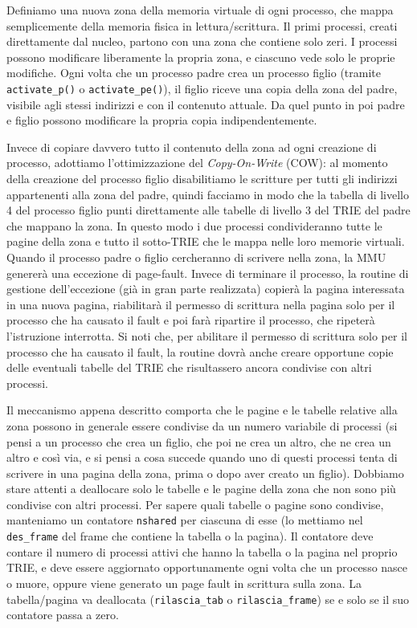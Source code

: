 Definiamo una nuova zona della memoria virtuale di ogni processo, che mappa semplicemente
della memoria fisica in lettura/scrittura. 
Il primi processi, creati direttamente
dal nucleo, partono con una zona che contiene solo zeri.
I processi possono modificare liberamente la propria zona, e ciascuno vede solo le proprie
modifiche.
Ogni volta che un processo padre crea un processo figlio (tramite \verb|activate_p()| o \verb|activate_pe()|), il figlio
riceve una copia della zona del padre, visibile agli stessi indirizzi e con il contenuto attuale.
Da quel punto in poi padre e figlio possono modificare la propria copia indipendentemente.

Invece di copiare davvero tutto il contenuto della zona ad ogni creazione di processo,
adottiamo l'ottimizzazione del {\em Copy-On-Write} (COW): al momento della creazione
del processo figlio disabilitiamo le scritture
per tutti gli indirizzi appartenenti alla zona del padre, quindi facciamo in modo che la tabella
di livello 4 del processo figlio punti direttamente alle tabelle di livello 3 del TRIE del
padre che mappano la zona. In questo modo i due processi condivideranno tutte le pagine della zona
e tutto il sotto-TRIE che le mappa nelle loro memorie virtuali. Quando il processo padre o figlio
cercheranno di scrivere nella zona, la MMU generer\`a una eccezione di page-fault. Invece di
terminare il processo, la routine di gestione dell'eccezione (gi\`a in gran parte realizzata) copier\`a la pagina
interessata in una nuova pagina, riabilitar\`a il permesso di scrittura nella pagina solo per
il processo che ha causato il fault e poi far\`a ripartire il processo, che ripeter\`a l'istruzione
interrotta. Si noti che, per abilitare il permesso di scrittura solo per il processo che ha causato
il fault, la routine dovr\`a anche creare opportune copie delle eventuali tabelle del TRIE che risultassero
ancora condivise con altri processi. 

Il meccanismo appena descritto comporta che le pagine e le tabelle relative
alla zona possono in generale essere condivise da un numero variabile di processi
(si pensi a un processo che crea un figlio, che poi ne crea un altro, che ne crea un altro e cos\`i via, e
si pensi a cosa succede quando uno di questi processi tenta di scrivere in una pagina della zona, prima o dopo
aver creato un figlio).
Dobbiamo stare attenti a deallocare solo le tabelle e le pagine
della zona che non sono pi\`u condivise con altri processi. Per sapere quali tabelle o pagine sono
condivise, manteniamo un contatore \verb|nshared| per ciascuna di esse (lo mettiamo nel \verb|des_frame|
del frame che contiene la tabella o la pagina). Il contatore deve contare il numero di processi attivi
che hanno la tabella o la pagina nel proprio TRIE, e deve essere aggiornato opportunamente ogni
volta che un processo nasce o muore, oppure viene generato un page fault in scrittura sulla zona.
La tabella/pagina va deallocata (\verb|rilascia_tab| o \verb|rilascia_frame|)
se e solo se il suo contatore passa a zero.

